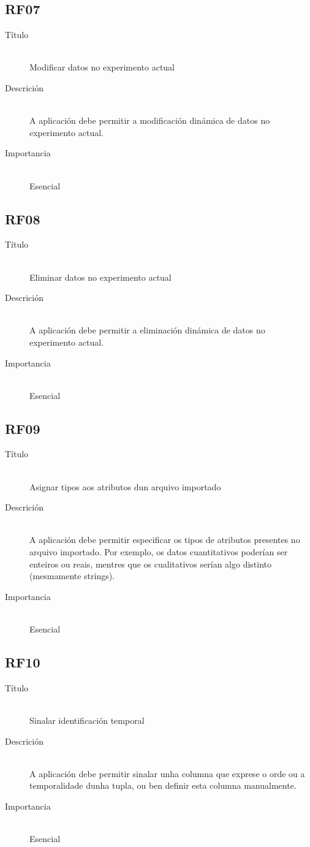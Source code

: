 \subsection*{RF07}
\begin{description}
\item[Título] \hfill \\
Modificar datos no experimento actual
\item[Descrición] \hfill \\
A aplicación debe permitir a modificación dinámica de datos no experimento actual.
\item[Importancia] \hfill \\
Esencial
\end{description}

\subsection*{RF08}
\begin{description}
\item[Título] \hfill \\
Eliminar datos no experimento actual
\item[Descrición] \hfill \\
A aplicación debe permitir a eliminación dinámica de datos no experimento actual.
\item[Importancia] \hfill \\
Esencial
\end{description}

\subsection*{RF09}
\begin{description}
\item[Título] \hfill \\
Asignar tipos aos atributos dun arquivo importado
\item[Descrición] \hfill \\
A aplicación debe permitir especificar os tipos de atributos presentes no arquivo importado. Por exemplo, os datos cuantitativos poderían ser enteiros ou reais, mentres que os cualitativos serían algo distinto (mesmamente strings).
\item[Importancia] \hfill \\
Esencial
\end{description}

\subsection*{RF10}
\begin{description}
\item[Título] \hfill \\
Sinalar identificación temporal
\item[Descrición] \hfill \\
A aplicación debe permitir sinalar unha columna que exprese o orde ou a temporalidade dunha tupla, ou ben definir esta columna manualmente.
\item[Importancia] \hfill \\
Esencial
\end{description}

